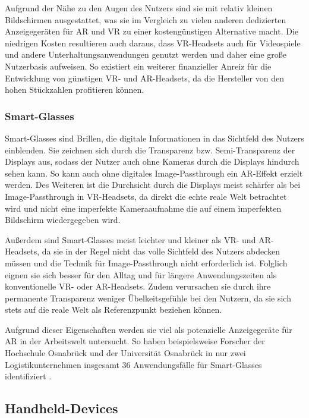     Aufgrund der Nähe zu den Augen des Nutzers sind sie mit relativ kleinen Bildschirmen ausgestattet, was sie im Vergleich zu vielen anderen dedizierten Anzeigegeräten für AR und VR zu einer kostengünstigen Alternative macht.
    Die niedrigen Kosten resultieren auch daraus, dass VR-Headsets auch für Videospiele und andere Unterhaltungsanwendungen genutzt werden und daher eine große Nutzerbasis aufweisen.
    So existiert ein weiterer finanzieller Anreiz für die Entwicklung von günstigen VR- und AR-Headsets, da die Hersteller von den hohen Stückzahlen profitieren können.
   

    \subsubsection{Smart-Glasses}

    Smart-Glasses sind Brillen, die digitale Informationen in das Sichtfeld des Nutzers einblenden.
    Sie zeichnen sich durch die Transparenz bzw. Semi-Transparenz der Displays aus, sodass der Nutzer auch ohne Kameras durch die Displays hindurch sehen kann.
    So kann auch ohne digitales Image-Passthrough ein AR-Effekt erzielt werden.
    Des Weiteren ist die Durchsicht durch die Displays meist schärfer als bei Image-Passthrough in VR-Headsets, da direkt die echte reale Welt betrachtet wird und nicht eine imperfekte Kameraaufnahme die auf einem imperfekten Bildschirm wiedergegeben wird.

    Außerdem sind Smart-Glasses meist leichter und kleiner als VR- und AR-Headsets, da sie in der Regel nicht das volle Sichtfeld des Nutzers abdecken müssen und die Technik für Image-Passthrough nicht erforderlich ist.
    Folglich eignen sie sich besser für den Alltag und für längere Anwendungszeiten als konventionelle VR- oder AR-Headsets.
    Zudem verursachen sie durch ihre permanente Transparenz weniger Übelkeitsgefühle bei den Nutzern, da sie sich stets auf die reale Welt als Referenzpunkt beziehen können.

    Aufgrund dieser Eigenschaften werden sie viel als potenzielle Anzeigegeräte für AR in der Arbeitswelt untersucht.
    So haben beispielsweise Forscher der Hochschule Osnabrück und der Universität Osnabrück in nur zwei Logistikunternehmen insgesamt 36 Anwendungsfälle für Smart-Glasses identifiziert \autocite[]{SmartGlasses2017}.


  \subsection{Handheld-Devices}

